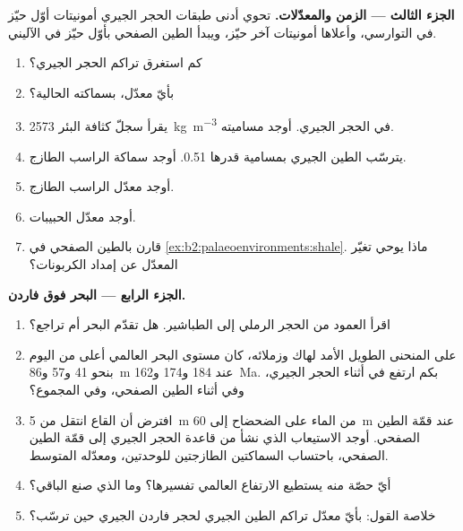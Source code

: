 \begin{problem}
\medskip\noindent\textbf{الجزء الثالث --- الزمن والمعدّلات.} تحوي أدنى طبقات الحجر الجيري
أمونيتات أوّل حيّز في التوارسي، وأعلاها أمونيتات آخر حيّز، ويبدأ الطين الصفحي
بأوّل حيّز في الآليني.
\begin{enumerate}[resume]
  \item كم استغرق تراكم الحجر الجيري؟
  \item بأيّ معدّل، بسماكته الحالية؟
  \item يقرأ سجلّ كثافة البئر \qty{2573}{kg.m^{-3}} في الحجر الجيري. أوجد
        مساميته.
  \item يترسّب الطين الجيري بمسامية قدرها 0.51. أوجد سماكة الراسب الطازج.
  \item أوجد معدّل الراسب الطازج.
  \item أوجد معدّل الحبيبات.
  \item قارن بالطين الصفحي في \cref{ex:b2:palaeoenvironments:shale}. ماذا يوحي تغيّر
        المعدّل عن إمداد الكربونات؟
\end{enumerate}

\medskip\noindent\textbf{الجزء الرابع --- البحر فوق فاردن.}
\begin{enumerate}[resume]
  \item اقرأ العمود من الحجر الرملي إلى الطباشير. هل تقدّم البحر أم تراجع؟
  \item على المنحنى الطويل الأمد لهاك وزملائه، كان مستوى البحر العالمي أعلى من اليوم بنحو 41 و57
        و\qty{86}{m} عند 184 و174 و\qty{162}{Ma}. بكم ارتفع في أثناء
        الحجر الجيري، وفي أثناء الطين الصفحي، وفي المجموع؟
  \item افترض أن القاع انتقل من \qty{5}{m} من الماء على الضحضاح إلى \qty{60}{m} عند قمّة
        الطين الصفحي. أوجد الاستيعاب الذي نشأ من قاعدة الحجر الجيري إلى قمّة
        الطين الصفحي، باحتساب السماكتين الطازجتين للوحدتين، ومعدّله المتوسط.
  \item أيّ حصّة منه يستطيع الارتفاع العالمي تفسيرها؟ وما الذي صنع الباقي؟
  \item خلاصة القول: بأيّ معدّل تراكم الطين الجيري لحجر فاردن الجيري حين
        ترسّب؟
\end{enumerate}
\end{problem}
